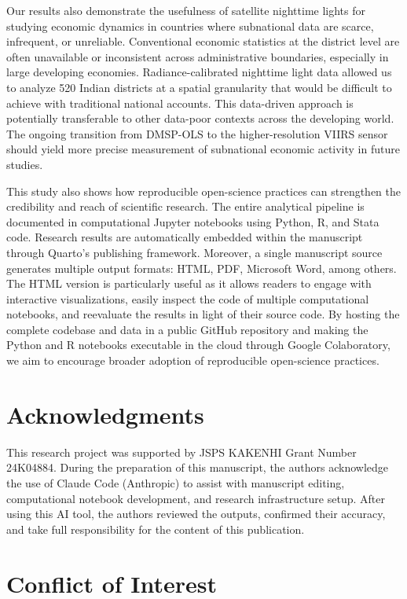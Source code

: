 \documentclass[
  letterpaper,
  DIV=11,
  numbers=noendperiod]{scrartcl}
\begin{document}
Our results also demonstrate the usefulness of satellite nighttime
lights for studying economic dynamics in countries where subnational
data are scarce, infrequent, or unreliable. Conventional economic
statistics at the district level are often unavailable or inconsistent
across administrative boundaries, especially in large developing
economies. Radiance-calibrated nighttime light data allowed us to
analyze 520 Indian districts at a spatial granularity that would be
difficult to achieve with traditional national accounts. This
data-driven approach is potentially transferable to other data-poor
contexts across the developing world. The ongoing transition from
DMSP-OLS to the higher-resolution VIIRS sensor should yield more precise
measurement of subnational economic activity in future studies.

This study also shows how reproducible open-science practices can
strengthen the credibility and reach of scientific research. The entire
analytical pipeline is documented in computational Jupyter notebooks
using Python, R, and Stata code. Research results are automatically
embedded within the manuscript through Quarto's publishing framework.
Moreover, a single manuscript source generates multiple output formats:
HTML, PDF, Microsoft Word, among others. The HTML version is
particularly useful as it allows readers to engage with interactive
visualizations, easily inspect the code of multiple computational
notebooks, and reevaluate the results in light of their source code. By
hosting the complete codebase and data in a public GitHub repository and
making the Python and R notebooks executable in the cloud through Google
Colaboratory, we aim to encourage broader adoption of reproducible
open-science practices.

\section{Acknowledgments}\label{acknowledgments}

This research project was supported by JSPS KAKENHI Grant Number
24K04884. During the preparation of this manuscript, the authors
acknowledge the use of Claude Code (Anthropic) to assist with manuscript
editing, computational notebook development, and research infrastructure
setup. After using this AI tool, the authors reviewed the outputs,
confirmed their accuracy, and take full responsibility for the content
of this publication.

\section{Conflict of Interest}\label{conflict-of-interest}
\end{document}
